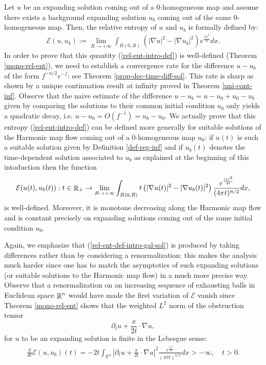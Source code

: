 \documentclass[a4paper,11pt,reqno]{amsart}
\def\R{\mathop{\rm \mathbb{R}}\nolimits}
\begin{document}
Let $u$ be an expanding solution coming out of a $0$-homogeneous map and assume there exists a background expanding solution $u_b$ coming out of the same $0$-homogeneous map. Then, the relative entropy of $u$ and $u_b$ is formally defined by:
\begin{eqnarray}
\mathcal{E}(u,u_b):=\lim_{R\rightarrow+\infty}\int_{B(0,R)}\left(|\nabla u|^2-|\nabla u_b|^2\right)e^{\frac{|x|^2}{4}}dx.\label{rel-ent-intro-def}
\end{eqnarray}
In order to prove that this quantity (\ref{rel-ent-intro-def}) is well-defined (Theorem \ref{mono-rel-ent}), we need to establish a convergence rate for the difference $u-u_b$ of the form $f^{-n/2}e^{-f}$: see Theorem \ref{prop-dec-time-diff-sol}. This rate is sharp as shown by a unique continuation result at infinity proved in Theorem \ref{uni-cont-inf}. Observe that the naive estimate of the difference $u-u_b=u-u_0+u_0-u_b$ given by comparing the solutions to their common initial condition $u_0$ only yields a quadratic decay, i.e. $u-u_0=\textit{O}(f^{-1})=u_b-u_0$. We actually prove that this entropy (\ref{rel-ent-intro-def}) can be defined more generally for suitable solutions of the Harmonic map flow coming out of a $0$-homogeneous map $u_0$: if $u(t)$ is such a suitable solution given by Definition \ref{def-reg-inf} and if $u_b(t)$ denotes the time-dependent solution associated to $u_b$ as explained at the beginning of this intoduction then the function
\begin{eqnarray}
\mathcal{E}(u(t),u_b(t)):t\in\R_+\rightarrow\lim_{R\rightarrow+\infty}\int_{B(0,R)}t\left(|\nabla u(t)|^2-|\nabla u_b(t)|^2\right)\frac{e^{\frac{|x|^2}{4t}}}{(4\pi t)^{n/2}}dx,\label{rel-ent-def-intro-gal-sol}
\end{eqnarray}
is well-defined. Moreover, it is monotone decreasing along the Harmonic map flow and is constant precisely on expanding solutions coming out of the same initial condition $u_0$.

Again, we emphasize that (\ref{rel-ent-def-intro-gal-sol}) is produced by taking differences rather than by considering a renormalization: this makes the analysis much harder since one has to match the asymptotics of such expanding solutions (or suitable solutions to the Harmonic map flow) in a much more precise way. Observe that a renormalization on an increasing sequence of exhausting balls in Euclidean space $\R^n$ would have made the first variation of $\mathcal{E}$ vanish since Theorem \ref{mono-rel-ent} shows that the weighted $L^2$ norm of the obstruction tensor $$\partial_tu+\frac{x}{2t}\cdot\nabla u,$$ for $u$ to be an expanding solution is finite in the Lebesgue sense:
\begin{eqnarray}
\frac{d}{dt}\mathcal{E}(u,u_b)(t)=-2t\int_{\mathbb{R}^n}\left|\partial_tu+\frac{x}{2t}\cdot\nabla u\right|^2\frac{e^{\frac{|x|^2}{4t}}}{(4\pi t)^{n/2}}dx>-\infty,\quad t>0.
\end{eqnarray}
\end{document}
